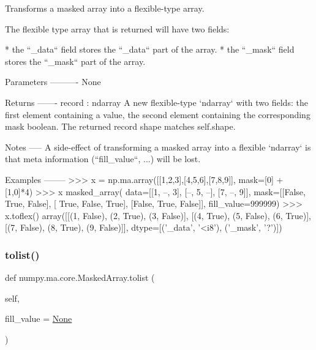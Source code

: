 \begin{DoxyVerb}Transforms a masked array into a flexible-type array.

The flexible type array that is returned will have two fields:

* the ``_data`` field stores the ``_data`` part of the array.
* the ``_mask`` field stores the ``_mask`` part of the array.

Parameters
----------
None

Returns
-------
record : ndarray
    A new flexible-type `ndarray` with two fields: the first element
    containing a value, the second element containing the corresponding
    mask boolean. The returned record shape matches self.shape.

Notes
-----
A side-effect of transforming a masked array into a flexible `ndarray` is
that meta information (``fill_value``, ...) will be lost.

Examples
--------
>>> x = np.ma.array([[1,2,3],[4,5,6],[7,8,9]], mask=[0] + [1,0]*4)
>>> x
masked_array(
  data=[[1, --, 3],
[--, 5, --],
[7, --, 9]],
  mask=[[False,  True, False],
[ True, False,  True],
[False,  True, False]],
  fill_value=999999)
>>> x.toflex()
array([[(1, False), (2,  True), (3, False)],
       [(4,  True), (5, False), (6,  True)],
       [(7, False), (8,  True), (9, False)]],
      dtype=[('_data', '<i8'), ('_mask', '?')])\end{DoxyVerb}
 \mbox{\label{classnumpy_1_1ma_1_1core_1_1MaskedArray_aa56556dfc54677c3fe8aff2e44a030e3}} 
\subsubsection{\texorpdfstring{tolist()}{tolist()}}
{\footnotesize\ttfamily def numpy.\+ma.\+core.\+Masked\+Array.\+tolist (\begin{DoxyParamCaption}\item[{}]{self,  }\item[{}]{fill\+\_\+value = {\ttfamily \hyperlink{namespacenumpy_1_1ma_1_1core_a647ee1848dfa3692fe35a663a2aa40b3}{None}} }\end{DoxyParamCaption})}

